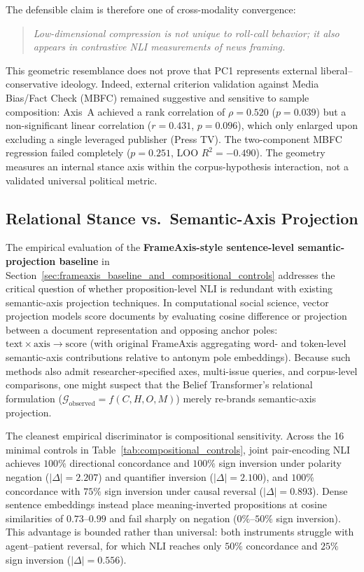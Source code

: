 The defensible claim is therefore one of cross-modality convergence:
\begin{quote}
\emph{Low-dimensional compression is not unique to roll-call behavior; it also appears in contrastive NLI measurements of news framing.}
\end{quote}
This geometric resemblance does not prove that PC1 represents external liberal--conservative ideology. Indeed, external criterion validation against Media Bias/Fact Check (MBFC) remained suggestive and sensitive to sample composition: Axis~A achieved a rank correlation of $\rho = 0.520$ ($p = 0.039$) but a non-significant linear correlation ($r = 0.431$, $p = 0.096$), which only enlarged upon excluding a single leveraged publisher (Press TV). The two-component MBFC regression failed completely ($p = 0.251$, LOO $R^2 = -0.490$). The geometry measures an internal stance axis within the corpus-hypothesis interaction, not a validated universal political metric.

\subsection{Relational Stance vs.\ Semantic-Axis Projection}
\label{sec:relational_vs_semantic_axis}

The empirical evaluation of the \textbf{FrameAxis-style sentence-level semantic-projection baseline} in Section~\ref{sec:frameaxis_baseline_and_compositional_controls} addresses the critical question of whether proposition-level NLI is redundant with existing semantic-axis projection techniques. In computational social science, vector projection models score documents by evaluating cosine difference or projection between a document representation and opposing anchor poles: $\text{text} \times \text{axis} \rightarrow \text{score}$ (with original FrameAxis aggregating word- and token-level semantic-axis contributions relative to antonym pole embeddings). Because such methods also admit researcher-specified axes, multi-issue queries, and corpus-level comparisons, one might suspect that the Belief Transformer's relational formulation ($\mathcal{G}_{\text{observed}} = f(C, H, O, M)$) merely re-brands semantic-axis projection.

The cleanest empirical discriminator is compositional sensitivity. Across the 16 minimal controls in Table~\ref{tab:compositional_controls}, joint pair-encoding NLI achieves $100\%$ directional concordance and $100\%$ sign inversion under polarity negation ($|\Delta| = 2.207$) and quantifier inversion ($|\Delta| = 2.100$), and $100\%$ concordance with $75\%$ sign inversion under causal reversal ($|\Delta| = 0.893$). Dense sentence embeddings instead place meaning-inverted propositions at cosine similarities of $0.73$--$0.99$ and fail sharply on negation ($0\%$--$50\%$ sign inversion). This advantage is bounded rather than universal: both instruments struggle with agent--patient reversal, for which NLI reaches only $50\%$ concordance and $25\%$ sign inversion ($|\Delta| = 0.556$).

